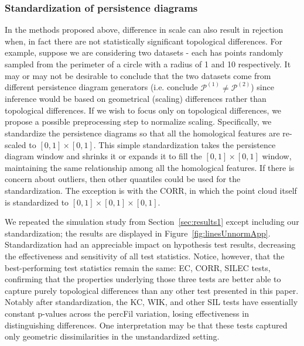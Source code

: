 \documentclass[12pt]{article}
\newcommand{\figref}[1]{Figure~\ref{#1}}
\begin{document}
\subsubsection{Standardization of persistence diagrams} \label{sec:standardize}
In the methods proposed above, difference in scale can also result in rejection when, in fact there are not statistically significant topological differences. For example, suppose we are considering two datasets - each has points randomly sampled from the perimeter of a circle with a radius of 1 and 10 respectively. It may or may not be desirable to conclude that the two datasets come from different persistence diagram generators (i.e. conclude $\mathcal P^{(1)} \neq \mathcal P^{(2)}$) since inference would be based on geometrical (scaling) differences rather than topological differences. If we wish to focus only on topological differences, we propose a possible preprocessing step to normalize scaling. Specifically, we standardize the persistence diagrams so that all the homological features are re-scaled to $[0, 1]\times[0,1]$. This simple standardization takes the persistence diagram window and shrinks it or expands it to fill the $[0, 1]\times[0,1]$ window, maintaining the same relationship among all the homological features. If there is concern about outliers, then other quantiles could be used for the standardization. The exception is with the CORR, in which the point cloud itself is standardized to $[0, 1]\times[0, 1]\times[0, 1]$.

We repeated the simulation study from Section~\ref{sec:results1} except including our standardization; the results are displayed in \figref{fig:linesUnnormApp}. Standardization had an appreciable impact on hypothesis test results, decreasing the effectiveness and sensitivity of all test statistics. Notice, however, that the best-performing test statistics remain the same: EC, CORR, SILEC tests, confirming that the properties underlying those three tests are better able to capture purely topological differences than any other test presented in this paper. Notably after standardization, the KC, WIK, and other SIL tests have essentially constant p-values across the percFil variation, losing effectiveness in distinguishing differences. One interpretation may be that these tests captured only geometric dissimilarities in the unstandardized setting.

\end{document}
